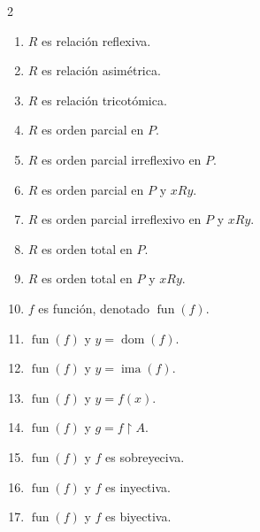 \documentclass[letterpaper,DIV=15,12pt]{scrartcl}
\begin{document}
\begin{multicols}{2}
\begin{enumerate}
            \item $R$ es relación reflexiva.
            \item $R$ es relación asimétrica.
            \item $R$ es relación tricotómica.
            \item $R$ es orden parcial en $P$.
            \item $R$ es orden parcial irreflexivo en $P$.
            \item $R$ es orden parcial en $P$ y $x R y$.
            \item $R$ es orden parcial irreflexivo en $P$ y $x R y$.
            \item $R$ es orden total en $P$.
            \item $R$ es orden total en $P$ y $x R y$.
            \item $f$ es función, denotado $\operatorname*{fun}(f)$.
            \item $\operatorname*{fun}(f)$ y $y=\operatorname*{dom}(f)$.
            \item $\operatorname*{fun}(f)$ y $y=\operatorname*{ima}(f)$.
            \item $\operatorname*{fun}(f)$ y $y=f(x)$.
            \item $\operatorname*{fun}(f)$ y $g=f \upharpoonright A$.
            \item $\operatorname*{fun}(f)$ y $f$ es sobreyeciva.
            \item $\operatorname*{fun}(f)$ y $f$ es inyectiva.
            \item $\operatorname*{fun}(f)$ y $f$ es biyectiva.
        \end{enumerate}
    \end{multicols}
\end{document}
